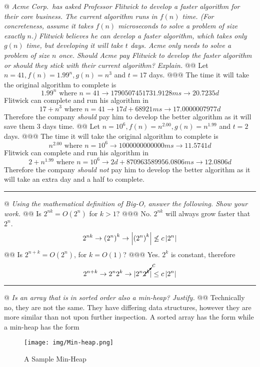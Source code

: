 \documentclass[10pt]{article}
\begin{document}
\begin{easylist}[enumerate]
    @ \textit{Acme Corp.\ has asked Professor Flitwick to develop a faster algorithm for their core business. The current algorithm runs in $f(n)$ time. (For concreteness, assume it takes $f(n)$ microseconds to solve a problem of size exactly $n$.) Flitwick believes he can develop a faster algorithm, which takes only $g(n)$ time, but developing it will take $t$ days. Acme only needs to solve a problem of size $n$ once. Should Acme pay Flitwick to develop the faster algorithm or should they stick with their current algorithm? Explain.}
    @@ Let $n = 41, f (n) = 1.99^n , g(n) = n^3$ and $t = 17$ days.
    @@@ The time it will take the original algorithm to complete is
        \[ 1.99^n \text{ where } n=41 \to 1790507451731.9128 ms \to 20.7235 d \]
        Flitwick can complete and run his algorithm in
        \[ 17 + n^3 \text{ where } n=41 \to 17 d + 68921 ms \to 17.0000007977 d \]
        Therefore the company \textit{should} pay him to develop the better algorithm as it will save them 3 days time.
    @@ Let $n = 10^6 , f (n) = n^{2.00} , g(n) = n^{1.99}$ and $t = 2$ days.
    @@@ The time it will take the original algorithm to complete is
        \[ n^{2.00} \text{ where } n=10^6 \to 1000000000000 ms \to 11.5741 d \]
        Flitwick can complete and run his algorithm in
        \[ 2 + n^{1.99} \text{ where } n=10^6 \to 2 d + 870963589956.0806 ms \to 12.0806 d \]
        Therefore the company \textit{should not} pay him to develop the better algorithm as it will take an extra day and a half to complete.

    \rule{3in}{0.5pt}

    @ \textit{Using the mathematical definition of Big-O, answer the following. Show your work.}
    @@ Is $2^{nk} = O(2^n)$ for $k > 1$?
    @@@ No. $2^{nk}$ will always grow faster that $2^n$.
        \[ 2^{nk} \to {(2^n)}^k \to \left\lvert  {(2^n)}^k \right\rvert \not\le c \left\lvert 2^n \right\rvert \]
    @@ Is $2^{n+k} = O(2^n)$, for $k = O(1)$?
    @@@ Yes. $2^k$ is constant, therefore
        \[ 2^{n+k} \to 2^n 2^k \to \vert {2^n \cancelto{c}{2^k} } \vert \le c \left\lvert 2^n \right\rvert \]

    \rule{3in}{0.5pt}

    @ \textit{Is an array that is in sorted order also a min-heap? Justify.}
    @@ Technically no, they are not the same. They have differing data structures, however they are more similar than not upon further inspection. A sorted array has the form {\ttfamily [1, 2, 3, 4, 5]} while a min-heap has the form

        \begin{figure}[ht]
            \centering
            \texttt{[image: img/Min-heap.png]}
            \caption{A Sample Min-Heap}
        \end{figure}


\end{easylist}
\end{document}
